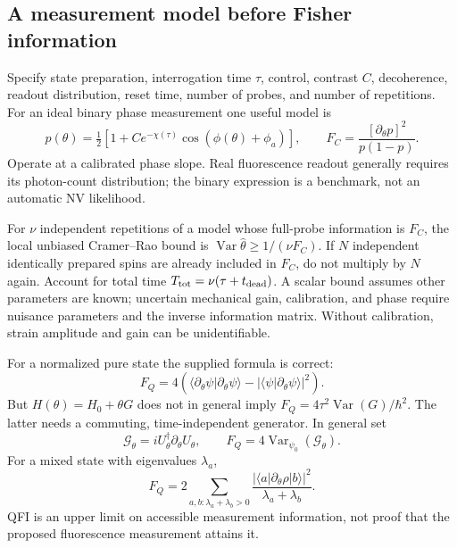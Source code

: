 \documentclass[a4paper,11pt]{article}
\newcommand{\Var}{\operatorname{Var}}
\begin{document}
\subsection{A measurement model before Fisher information}

Specify state preparation, interrogation time $\tau$, control, contrast $C$, decoherence, readout distribution, reset time, number of probes, and number of repetitions. For an ideal binary phase measurement one useful model is
\begin{equation}
 p(\theta)=\tfrac12[1+C e^{-\chi(\tau)}\cos(\phi(\theta)+\phi_a)],\qquad
 F_C=\frac{[\partial_\theta p]^2}{p(1-p)}.
\end{equation}
Operate at a calibrated phase slope. Real fluorescence readout generally requires its photon-count distribution; the binary expression is a benchmark, not an automatic NV likelihood.

For $\nu$ independent repetitions of a model whose full-probe information is $F_C$, the local unbiased Cramer--Rao bound is $\Var\hat\theta\geq1/(\nu F_C)$. If $N$ independent identically prepared spins are already included in $F_C$, do not multiply by $N$ again. Account for total time $T_{\rm tot}=\nu(\tau+t_{\rm dead})$. A scalar bound assumes other parameters are known; uncertain mechanical gain, calibration, and phase require nuisance parameters and the inverse information matrix. Without calibration, strain amplitude and gain can be unidentifiable.

For a normalized pure state the supplied formula is correct:
\begin{equation}
 F_Q=4\left(\langle\partial_\theta\psi|\partial_\theta\psi\rangle
 -|\langle\psi|\partial_\theta\psi\rangle|^2\right).
\end{equation}
But $H(\theta)=H_0+\theta G$ does not in general imply $F_Q=4\tau^2\Var(G)/\hbar^2$. The latter needs a commuting, time-independent generator. In general set
\begin{equation}
 \mathcal G_\theta=iU_\theta^\dagger\partial_\theta U_\theta,
 \qquad F_Q=4\Var_{\psi_0}(\mathcal G_\theta).
\end{equation}
For a mixed state with eigenvalues $\lambda_a$,
\begin{equation}
 F_Q=2\sum_{a,b:\lambda_a+\lambda_b>0}
 \frac{|\langle a|\partial_\theta\rho|b\rangle|^2}{\lambda_a+\lambda_b}.
\end{equation}
QFI is an upper limit on accessible measurement information, not proof that the proposed fluorescence measurement attains it.~\cite{braunstein,degen}
\end{document}
